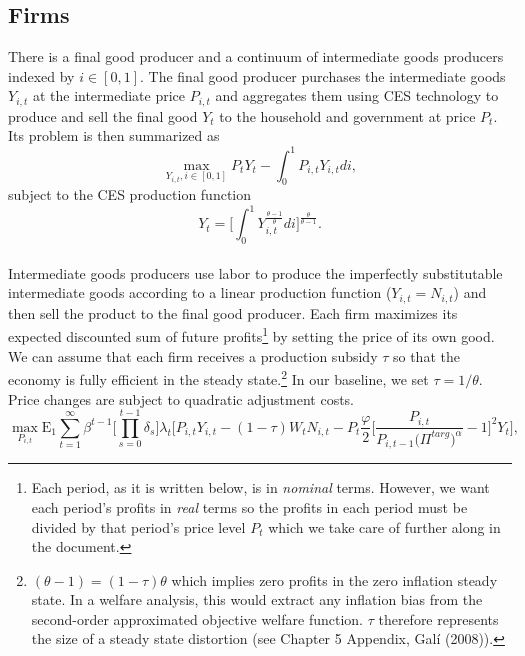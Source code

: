 \documentclass[11pt]{article}
\begin{document}
\begin{singlespace}
		\subsection{Firms}
		
		\normalsize{There is a final good producer and a continuum of intermediate goods producers indexed by \(i \in [0,1]\). The final good producer purchases the intermediate goods \(Y_{i,t}\) at the intermediate price \(P_{i,t}\) and aggregates them using CES technology to produce and sell the final good \(Y_{t}\) to the household and government at price \(P_{t}\). Its problem is then summarized as}
		\begin{equation}
			\max\limits_{Y_{i,t},i \in [0,1]} P_{t}Y_{t} - \int\nolimits^{1}_{0} P_{i,t}Y_{i,t}di,
		\end{equation}
		\normalsize{subject to the CES production function}
		\begin{equation}
			Y_{t} = \Bigg[\int\nolimits_{0}^{1}Y_{i,t}^{\frac{\theta-1}{\theta}}di\Bigg]^{\frac{\theta}{\theta-1}}.
		\end{equation}\\
		\normalsize{Intermediate goods producers use labor to produce the imperfectly substitutable intermediate goods according to a linear production function (\(Y_{i,t}=N_{i,t}\)) and then sell the product to the final good producer. Each firm maximizes its expected discounted sum of future profits\footnote{Each period, as it is written below, is in \textit{nominal} terms. However, we want each period's profits in \textit{real} terms so the profits in each period must be divided by that period's price level \(P_{t}\) which we take care of further along in the document.} by setting the price of its own good. We can assume that each firm receives a production subsidy \(\tau\) so that the economy is fully efficient in the steady state.\footnote{\((\theta-1)=(1-\tau)\theta\) which implies zero profits in the zero inflation steady state. In a welfare analysis, this would extract any inflation bias from the second-order approximated objective welfare function. \(\tau\) therefore represents the size of a steady state distortion (see Chapter 5 Appendix, Gal\'{i} (2008)).} In our baseline, we set $\tau = 1/\theta$. Price changes are subject to quadratic adjustment costs. }\\
		\begin{equation}
			\max\limits_{P_{i,t}} \mathrm{E_{1}}\sum\limits_{t=1}^{\infty}\beta^{t-1}\Bigg[\prod\limits_{s=0}^{t-1}\delta_{s}\Bigg]\lambda_{t}\Bigg[P_{i,t}Y_{i,t}-( 1-\tau )W_{t}N_{i,t}-P_{t}\frac{\varphi}{2}\Big[\frac{P_{i,t}}{P_{i,t-1}\bigl(\Pi^{targ}\bigr)^{\alpha}}-1\Big]^{2}Y_{t}\Bigg],

\end{equation}
\end{singlespace}
\end{document}
